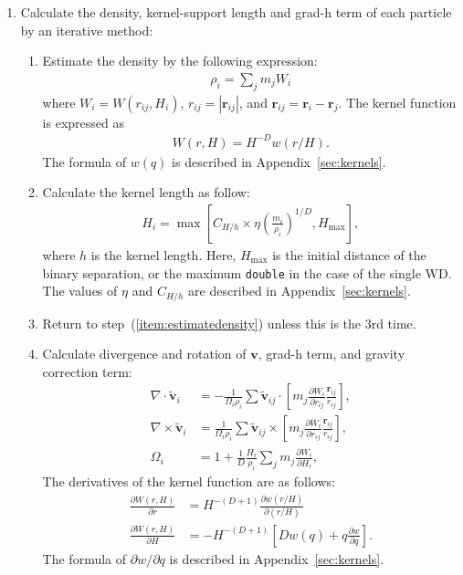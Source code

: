 \documentclass[fleqn,dvipdfmx]{article}
\begin{document}
\begin{enumerate}
\item Calculate the density, kernel-support length and grad-h term of
  each particle by an iterative method:
  \begin{enumerate}
  \item Estimate the density by the following
    expression: \label{item:estimatedensity}
    \begin{align}
      \rho_i = \sum_j m_j W_i
    \end{align}
    where $W_i=W(r_{ij},H_i)$, $r_{ij}=|\bm{r}_{ij}|$, and
    $\bm{r}_{ij}=\bm{r}_i-\bm{r}_j$. The kernel function is expressed
    as
    \begin{align}
      W(r,H) = H^{-D} w(r/H).
    \end{align}
    The formula of $w(q)$ is described in Appendix~\ref{sec:kernels}.
  \item Calculate the kernel length as follow:
    \begin{align}
      H_i = \max \left[ C_{H/h} \times \eta \left( \frac{m_i}{\rho_i}
        \right)^{1/D}, H_{\max} \right],
    \end{align}
    where $h$ is the kernel length. Here, $H_{\max}$ is the initial
    distance of the binary separation, or the maximum \texttt{double}
    in the case of the single WD. The values of $\eta$ and $C_{H/h}$
    are described in Appendix~\ref{sec:kernels}.
  \item Return to step~(\ref{item:estimatedensity}) unless this is the
    3rd time.
  \item Calculate divergence and rotation of $\bm{v}$, grad-h term,
    and gravity correction term:
    \begin{align}
      \nabla \cdot \tilde{\bm{v}}_i &= - \frac{1}{\Omega_i \rho_i} \sum
      \tilde{\bm{v}}_{ij} \cdot \left[ m_j \frac{\partial
          W_i}{\partial r_{ij}} \frac{\bm{r}_{ij}}{r_{ij}} \right], \\
      \nabla \times \tilde{\bm{v}}_i &= \frac{1}{\Omega_i \rho_i} \sum
      \tilde{\bm{v}}_{ij} \times \left[ m_j \frac{\partial
          W_i}{\partial r_{ij}} \frac{\bm{r}_{ij}}{r_{ij}} \right],
      \\
      \Omega_i &= 1 + \frac{1}{D} \frac{H_i}{\rho_i} \sum_j m_j
      \frac{\partial W_i}{\partial H_i},
    \end{align}
    The derivatives of the kernel function are as follows:
    \begin{align}
      \frac{\partial W(r,H)}{\partial r} &= H^{-(D+1)} \frac{\partial
        w(r/H)}{\partial (r/H)} \\
      \frac{\partial W(r,H)}{\partial H} &= -H^{-(D+1)} \left[ D w(q)
        + q \frac{\partial w}{\partial q} \right].
    \end{align}
    The formula of $\partial w/\partial q$ is described in
    Appendix~\ref{sec:kernels}.
  \end{enumerate}
  

\end{enumerate}
\end{document}
